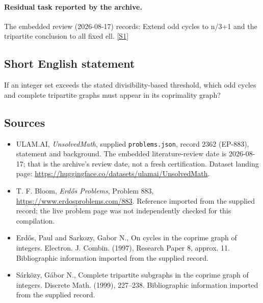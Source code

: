 \documentclass[11pt,a4paper]{article}
\newcommand{\sref}[2]{\hyperlink{source:#1:#2}{[S#2]}}
\begin{document}
\paragraph{Residual task reported by the archive.}

The embedded review (2026-08-17) records: Extend odd cycles to n/3+1 and the tripartite conclusion to all fixed ell. \sref{2362}{1}

\subsection{Short English statement}

If an integer set exceeds the stated divisibility-based threshold, which odd cycles and complete tripartite graphs must appear in its coprimality graph?

\subsection{Sources}

{\small

\begin{itemize}

\item[\hypertarget{source:2362:1}{S1}] ULAM.AI, \emph{UnsolvedMath}, supplied \texttt{problems.json}, record 2362 (EP-883), statement and background. The embedded literature-review date is 2026-08-17; that is the archive’s review date, not a fresh certification. Dataset landing page: \url{https://huggingface.co/datasets/ulamai/UnsolvedMath}.

\item[\hypertarget{source:2362:2}{S2}] T. F. Bloom, \emph{Erdős Problems}, Problem 883, \url{https://www.erdosproblems.com/883}. Reference imported from the supplied record; the live problem page was not independently checked for this compilation.

\item[\hypertarget{source:2362:3}{S3}] Erd\H{o}s, Paul and Sarkozy, Gabor N., On cycles in the coprime graph of integers. Electron. J. Combin. (1997), Research Paper 8, approx. 11. Bibliographic information imported from the supplied record.

\item[\hypertarget{source:2362:4}{S4}] S\'ark\"{o}zy, G\'abor N., Complete tripartite subgraphs in the coprime graph of integers. Discrete Math. (1999), 227--238. Bibliographic information imported from the supplied record.

\end{itemize}

}

\label{end:2362}
\end{document}
